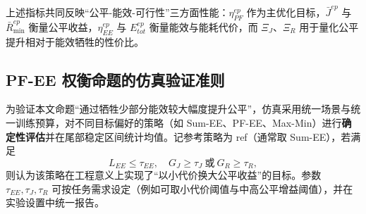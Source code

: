 \documentclass[journal,onecolumn]{IEEEtran}
\begin{document}
	上述指标共同反映“公平-能效-可行性”三方面性能：$\eta_{PF}^{ep}$ 作为主优化目标，$\bar{J}^{ep}$ 与 $\bar{R}_{\min}^{ep}$ 衡量公平收益，$\eta_{EE}^{ep}$ 与 $E_{tot}^{ep}$ 衡量能效与能耗代价，而 $\Xi_J$、$\Xi_R$ 用于量化公平提升相对于能效牺牲的性价比。

	\subsection{PF-EE 权衡命题的仿真验证准则}
	为验证本文命题“通过牺牲少部分能效较大幅度提升公平”，仿真采用统一场景与统一训练预算，对不同目标偏好的策略（如 Sum-EE、PF-EE、Max-Min）进行\textbf{确定性评估}并在尾部稳定区间统计均值。记参考策略为 ref（通常取 Sum-EE），若满足
	\begin{equation}
		L_{EE} \leq \tau_{EE},\quad G_J \geq \tau_J \ \text{或}\  G_R \geq \tau_R,
		\label{eq:tradeoff_criterion}
	\end{equation}
	则认为该策略在工程意义上实现了“以小代价换大公平收益”的目标。参数 $\tau_{EE},\tau_J,\tau_R$ 可按任务需求设定（例如可取小代价阈值与中高公平增益阈值），并在实验设置中统一报告。
	
	
\end{document}
